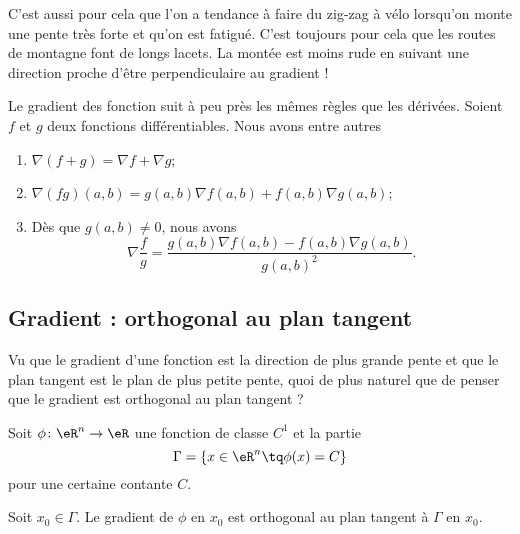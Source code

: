 C'est aussi pour cela que l'on a tendance à faire du zig-zag à vélo lorsqu'on monte une pente très forte et qu'on est fatigué. C'est toujours pour cela que les routes de montagne font de longs lacets. La montée est moins rude en suivant une direction proche d'être perpendiculaire au gradient !

\begin{theorem}
    Le gradient des fonction suit à peu près les mêmes règles que les dérivées. Soient $f$ et $g$ deux fonctions différentiables. Nous avons entre autres
    \begin{enumerate}
        \item
            $\nabla(f+g)=\nabla f+\nabla g$;
        \item
            $\nabla(fg)(a,b)=g(a,b)\nabla f(a,b)+f(a,b)\nabla g(a,b)$;
        \item
            Dès que $g(a,b)\neq 0$, nous avons
            \begin{equation}
                \nabla\frac{ f }{ g }=\frac{ g(a,b)\nabla f(a,b)-f(a,b)\nabla g(a,b) }{ g(a,b)^2 }.
            \end{equation}
    \end{enumerate}
\end{theorem}

\subsection{Gradient : orthogonal au plan tangent}

Vu que le gradient d'une fonction est la direction de plus grande pente et que le plan tangent est le plan de plus petite pente, quoi de plus naturel que de penser que le gradient est orthogonal au plan tangent ?

\begin{lemma}
    Soit \( \phi\colon \eR^n\to \eR\) une fonction de classe \( C^1\) et la partie
    \begin{equation}
        \Gamma=\{ x\in \eR^n\tq \phi(x)=C \}
    \end{equation}
    pour une certaine contante \( C\).

    Soit \( x_0\in \Gamma\). Le gradient de \( \phi\) en \( x_0\) est orthogonal au plan tangent à \( \Gamma\) en \( x_0\).
\end{lemma}

